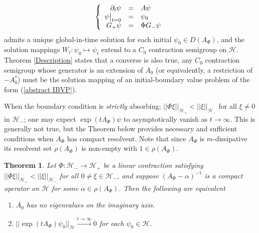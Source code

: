 \documentclass{article}
\numberwithin{equation}{section}
\newtheorem{theorem}{Theorem}[section]
\begin{document}
\begin{equation}\label{abstract IBVP}
    \left\{\begin{array}{rclr}
       \partial_t \psi&=& A \psi \quad 
       \\
       \psi\big{|}_{t=0} &=&\psi_0 
       \\
    G_+\psi&=&\Phi G_- \psi
    \end{array}
    \right.
\end{equation}
admits a unique global-in-time solution for each initial $\psi_0 \in D(A_\Phi)$, and the solution mappings $W_t:\psi_0\mapsto\psi_t$ extend to a $C_0$ contraction semigroup on $\mathcal{H}$. Theorem \ref{Description} states that a converse is also true, any $C_0$ contraction semigroup whose generator is an extension of $A_0$ (or equivalently, a restriction of $-A_0^*$) must be the solution mapping of an initial-boundary value problem of the form (\ref{abstract IBVP}).
\par
When the boundary condition is \textit{strictly} absorbing; $||\Phi \xi||_{\mathcal{H}_+}<||\xi||_{\mathcal{H}_-}$ for all $\xi \neq 0$ in $\mathcal{H}_-$; one may expect $\exp(tA_\Phi)\psi$ to asymptotically vanish as $t \to \infty$. This is generally not true, but the Theorem below provides necessary and sufficient conditions when $A_\Phi$ has compact resolvent. Note that since $A_\Phi$ is $m$-dissipative its resolvent set $\rho(A_\Phi)$ is non-empty with $1 \in \rho(A_\Phi)$.  
\begin{theorem}\label{asympt stability}
    Let $\Phi:\mathcal{H}_-\to \mathcal{H}_+$ be a linear contraction satisfying $||\Phi \xi||_{\mathcal{H}_+}<||\xi||_{\mathcal{H}_-}$ for all $0\neq \xi \in \mathcal{H}_-$, and suppose $(A_\Phi - \alpha)^{-1}$ is a compact operator on $\mathcal{H}$ for some $\alpha \in \rho(A_\Phi)$. Then the following are equivalent
    \begin{enumerate}
        \item $\overline{A_0}$ has no eigenvalues on the imaginary axis.
        \item $||\exp(tA_\Phi)\psi_0||_\mathcal{H}\xrightarrow{t \to \infty}0$ for each $\psi_0 \in \mathcal{H}$.
    \end{enumerate}
\end{theorem}
\end{document}
